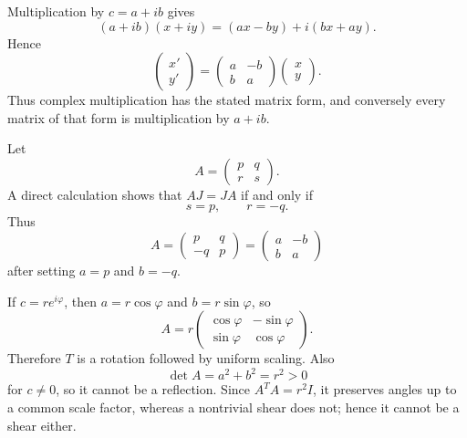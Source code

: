 \begin{solution}
Multiplication by \(c=a+ib\) gives
\[
(a+ib)(x+iy)=(ax-by)+i(bx+ay).
\]
Hence
\[
\begin{pmatrix}
x'\\y'
\end{pmatrix}
=
\begin{pmatrix}
a&-b\\
b&a
\end{pmatrix}
\begin{pmatrix}
x\\y
\end{pmatrix}.
\]
Thus complex multiplication has the stated matrix form, and conversely every matrix of that
form is multiplication by \(a+ib\).

Let
\[
A=
\begin{pmatrix}
p&q\\
r&s
\end{pmatrix}.
\]
A direct calculation shows that \(AJ=JA\) if and only if
\[
s=p,\qquad r=-q.
\]
Thus
\[
A=
\begin{pmatrix}
p&q\\
-q&p
\end{pmatrix}
=
\begin{pmatrix}
a&-b\\
b&a
\end{pmatrix}
\]
after setting \(a=p\) and \(b=-q\).

If \(c=re^{i\varphi}\), then \(a=r\cos\varphi\) and \(b=r\sin\varphi\), so
\[
A=
r
\begin{pmatrix}
\cos\varphi&-\sin\varphi\\
\sin\varphi&\cos\varphi
\end{pmatrix}.
\]
Therefore \(T\) is a rotation followed by uniform scaling. Also
\[
\det A=a^2+b^2=r^2>0
\]
for \(c\neq0\), so it cannot be a reflection. Since \(A^TA=r^2I\), it preserves angles up to a
common scale factor, whereas a nontrivial shear does not; hence it cannot be a shear either.
\end{solution}


